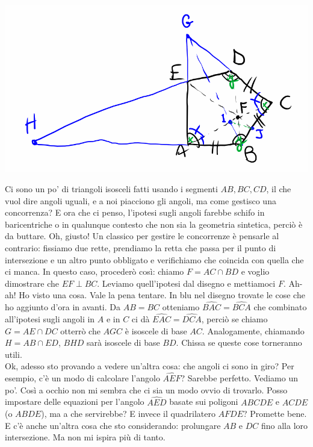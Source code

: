 \begin{sol}
  \begin{center}
    \includegraphics[width=1\textwidth]{secs/G1/G1-2.pdf}
  \end{center}

  Ci sono un po' di triangoli isosceli fatti usando i segmenti $AB, BC, CD$, il che vuol dire angoli uguali, e a noi piacciono gli angoli, ma come gestisco una concorrenza? E ora che ci penso, l'ipotesi sugli angoli farebbe schifo in baricentriche o in qualunque contesto che non sia la geometria sintetica, perciò è da buttare. Oh, giusto! Un classico per gestire le concorrenze è pensarle al contrario: fissiamo due rette, prendiamo la retta che passa per il punto di intersezione e un altro punto obbligato e verifichiamo che coincida con quella che ci manca. In questo caso, procederò così: chiamo $F=AC \cap BD$ e voglio dimostrare che $EF \perp BC$. Leviamo quell'ipotesi dal disegno e mettiamoci $F$. Ah-ah! Ho visto una cosa. Vale la pena tentare. In blu nel disegno trovate le cose che ho aggiunto d'ora in avanti. Da $AB=BC$ otteniamo $\widehat{BAC}=\widehat{BCA}$ che combinato all'ipotesi sugli angoli in $A$ e in $C$ ci dà $\widehat{EAC}=\widehat{DCA}$, perciò se chiamo $G=AE \cap DC$ otterrò che $AGC$ è isoscele di base $AC$. Analogamente, chiamando $H=AB \cap ED$, $BHD$ sarà isoscele di base $BD$. Chissa se queste cose torneranno utili. \\

  Ok, adesso sto provando a vedere un'altra cosa: che angoli ci sono in giro? Per esempio, c'è un modo di calcolare l'angolo $\widehat{AEF}$? Sarebbe perfetto. Vediamo un po'. Così a occhio non mi sembra che ci sia un modo ovvio di trovarlo. Posso impostare delle equazioni per l'angolo $\widehat{AED}$ basate sui poligoni $ABCDE$ e $ACDE$ (o $ABDE$), ma a che servirebbe? E invece il quadrilatero $AFDE$? Promette bene. E c'è anche un'altra cosa che sto considerando: prolungare $AB$ e $DC$ fino alla loro intersezione. Ma non mi ispira più di tanto.


\end{sol}

